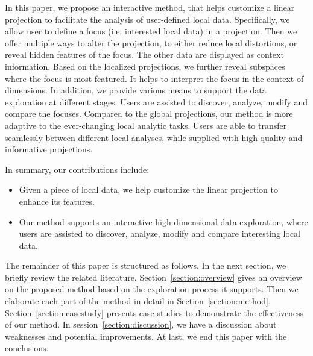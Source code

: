 In this paper, we propose an interactive method, that helps customize a linear projection to facilitate the analysis of user-defined local data. Specifically, we allow user to define a focus (i.e. interested local data) in a projection. Then we offer multiple ways to alter the projection, to either reduce local distortions, or reveal hidden features of the focus. The other data are displayed as context information. Based on the localized projections, we further reveal subspaces where the focus is most featured. It helps to interpret the focus in the context of dimensions. In addition, we provide various means to support the data exploration at different stages. Users are assisted to discover, analyze, modify and compare the focuses. Compared to the global projections, our method is more adaptive to the ever-changing local analytic tasks. Users are able to transfer seamlessly between different local analyses, while supplied with high-quality and informative projections.

In summary, our contributions include:
\begin{itemize}
\item Given a piece of local data, we help customize the linear projection to enhance its features.
\item Our method supports an interactive high-dimensional data exploration, where users are assisted to discover, analyze, modify and compare interesting local data.
\end{itemize}

The remainder of this paper is structured as follows. In the next section, we briefly review the related literature. Section~\ref{section:overview} gives an overview on the proposed method based on the exploration process it supports. Then we elaborate each part of the method in detail in Section~\ref{section:method}. Section~\ref{section:casestudy} presents case studies to demonstrate the effectiveness of our method. In session~\ref{section:discussion}, we have a discussion about weaknesses and potential improvements. At last, we end this paper with the conclusions.

